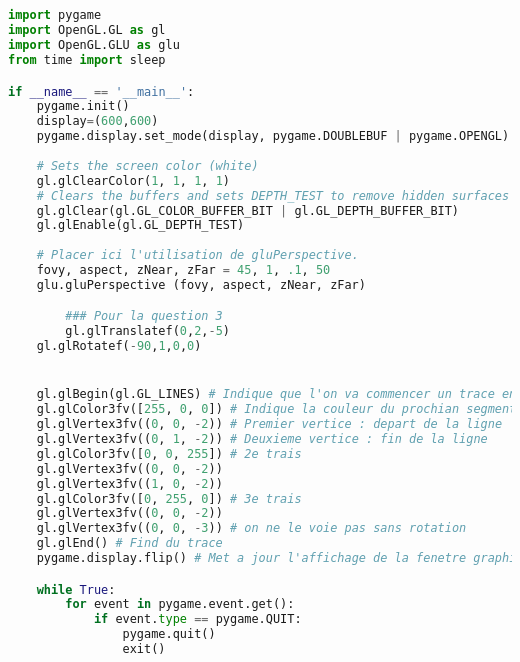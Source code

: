 \documentclass{article}
\begin{document}
\subsection{}
\begin{lstlisting}[language=Python]
import pygame
import OpenGL.GL as gl
import OpenGL.GLU as glu
from time import sleep

if __name__ == '__main__':
    pygame.init()
    display=(600,600)
    pygame.display.set_mode(display, pygame.DOUBLEBUF | pygame.OPENGL)
    
    # Sets the screen color (white)
    gl.glClearColor(1, 1, 1, 1)
    # Clears the buffers and sets DEPTH_TEST to remove hidden surfaces
    gl.glClear(gl.GL_COLOR_BUFFER_BIT | gl.GL_DEPTH_BUFFER_BIT)                  
    gl.glEnable(gl.GL_DEPTH_TEST)    
    
    # Placer ici l'utilisation de gluPerspective.
    fovy, aspect, zNear, zFar = 45, 1, .1, 50
    glu.gluPerspective (fovy, aspect, zNear, zFar)

		### Pour la question 3
		gl.glTranslatef(0,2,-5) 
    gl.glRotatef(-90,1,0,0)


    gl.glBegin(gl.GL_LINES) # Indique que l'on va commencer un trace en mode lignes (segments)
    gl.glColor3fv([255, 0, 0]) # Indique la couleur du prochian segment en RGB
    gl.glVertex3fv((0, 0, -2)) # Premier vertice : depart de la ligne
    gl.glVertex3fv((0, 1, -2)) # Deuxieme vertice : fin de la ligne
    gl.glColor3fv([0, 0, 255]) # 2e trais 
    gl.glVertex3fv((0, 0, -2))
    gl.glVertex3fv((1, 0, -2))
    gl.glColor3fv([0, 255, 0]) # 3e trais
    gl.glVertex3fv((0, 0, -2))
    gl.glVertex3fv((0, 0, -3)) # on ne le voie pas sans rotation 
    gl.glEnd() # Find du trace
    pygame.display.flip() # Met a jour l'affichage de la fenetre graphique

    while True:
        for event in pygame.event.get():
            if event.type == pygame.QUIT:
                pygame.quit()
                exit()

\end{lstlisting}
\end{document}
